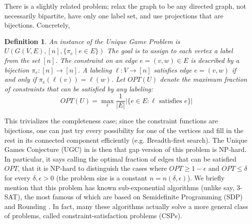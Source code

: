\documentclass[10pt]{article}
\newtheorem{definition}{Definition}
\begin{document}
There is a slightly related problem; relax the graph to be any directed graph, not necessarily bipartite, have only one label set, and use projections that are bijections.
Concretely,
\begin{definition}
     An instance of the Unique Game Problem is $U(G(V, E), [n], \{\pi_e \mid e \in E\})$ The goal is to assign to each vertex a label from the set $[n]$. The constraint on an edge $e = (v, w) \in E$ is described by a bijection $\pi_e : [n] \to [n]$. A labeling $\ell : V \to [n]$ satisfies edge $e = (v, w)$ if and only if $\pi_e(\ell(v)) = \ell(w)$. Let $OPT(U)$ denote the maximum
     fraction of constraints that can be satisfied by any labeling:
\[ OPT(U) = \max_{\ell} \frac{1}{|E|} |\{e \in E : \ell \text{ satisfies } e\}| \]
\end{definition}
This trivializes the completeness case; since the constraint functions are bijections, one can just try every possibility for one of the vertices and fill in the rest in its connected component efficiently (e.g. Breadth-first search).
The Unique Games Conjecture (UGC) in \cite{ugc} is then that gap version of this problem is NP-hard. In particular, it says calling the optimal fraction of edges that can be satisfied $OPT$, that it is NP-hard to distinguish the cases where $OPT \geq 1 - \epsilon$ and $OPT \leq \delta$ for every $\delta, \epsilon > 0$ (the problem size is a constant $n = n(\delta, \epsilon)$). We briefly mention that this problem has known sub-exponential algorithms (unlike say, 3-SAT), the most famous of which are based on Semidefinite Programming (SDP) and Rounding \cite{sdpcsp}. In fact, many these algorithms actually solve a more general class of problems, called constraint-satisfaction problems (CSPs). 
\end{document}
